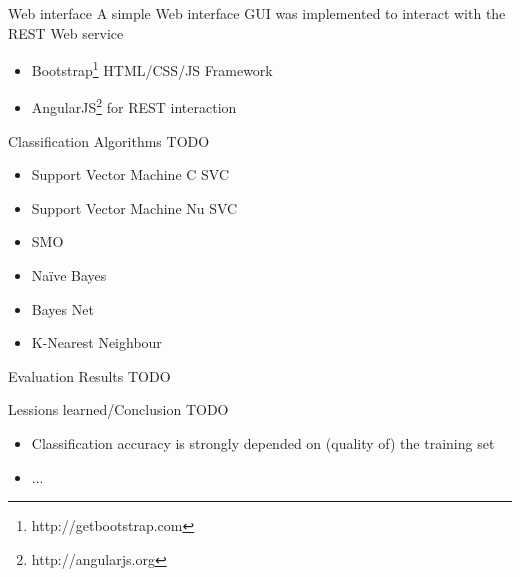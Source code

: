 \documentclass{beamer}
\begin{document}
\begin{frame}{Web interface}
A simple Web interface GUI was implemented to interact with the REST Web service
\begin{itemize}
 \item Bootstrap\footnote{http://getbootstrap.com} HTML/CSS/JS Framework
 \item AngularJS\footnote{http://angularjs.org} for REST interaction
\end{itemize}
\end{frame}

\begin{frame}{Classification Algorithms}
TODO
  \begin{itemize}
	\item Support Vector Machine C SVC
	\item Support Vector Machine Nu SVC
	\item SMO
	\item Na\"ive Bayes
	\item Bayes Net
	\item K-Nearest Neighbour
 \end{itemize}
\end{frame}

\begin{frame}{Evaluation Results}
TODO
\end{frame}

\begin{frame}{Lessions learned/Conclusion}
TODO
\begin{itemize}
 \item Classification accuracy is strongly depended on (quality of) the training set
 \item ...
 \end{itemize}
\end{frame}
\end{document}
